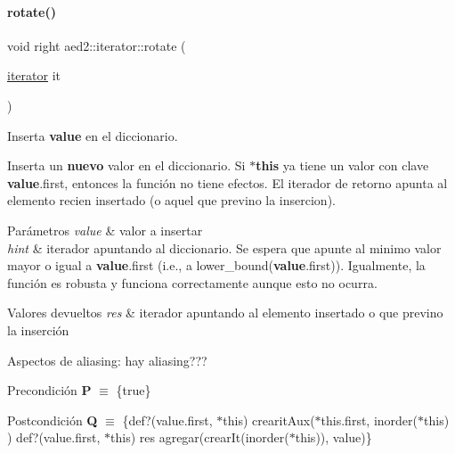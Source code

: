 \paragraph{\texorpdfstring{rotate()}{rotate()}\hspace{0.1cm}{\footnotesize\ttfamily [2/2]}}
{\footnotesize\ttfamily void right aed2\+::iterator\+::rotate (\begin{DoxyParamCaption}\item[{\hyperlink{classaed2_1_1iterator_1_1iterator}{iterator}}]{it }\end{DoxyParamCaption})\hspace{0.3cm}{\ttfamily [inline]}}



Inserta {\bfseries value} en el diccionario. 

Inserta un {\bfseries nuevo} valor en el diccionario. Si {\bfseries $\ast$this} ya tiene un valor con clave {\bfseries value}.first, entonces la función no tiene efectos. El iterador de retorno apunta al elemento recien insertado (o aquel que previno la insercion).


\begin{DoxyParams}{Parámetros}
{\em value} & valor a insertar \\
\hline
{\em hint} & iterador apuntando al diccionario. Se espera que apunte al minimo valor mayor o igual a {\bfseries value}.first (i.\+e., a lower\+\_\+bound({\bfseries value}.first)). Igualmente, la función es robusta y funciona correctamente aunque esto no ocurra. \\
\hline
\end{DoxyParams}

\begin{DoxyRetVals}{Valores devueltos}
{\em res} & iterador apuntando al elemento insertado o que previno la inserción\\
\hline
\end{DoxyRetVals}
\begin{DoxyParagraph}{Aspectos de aliasing\+:}
hay aliasing???
\end{DoxyParagraph}
\begin{DoxyPrecond}{Precondición}
{\bfseries P} $\equiv$ \{true\} 
\end{DoxyPrecond}
\begin{DoxyPostcond}{Postcondición}
{\bfseries Q} $\equiv$ \{def?(value.\+first, $\ast$this)  crearit\+Aux($\ast$this.first, inorder($\ast$this) )   def?(value.\+first, $\ast$this)  res  agregar(crear\+It(inorder($\ast$this)), value)\}
\end{DoxyPostcond}

